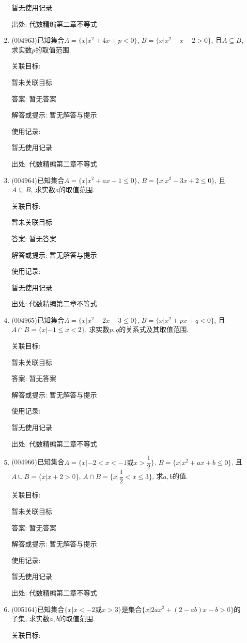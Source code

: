 \documentclass[10pt,a4paper]{article}
\begin{document}
\begin{enumerate}[1.]
暂无使用记录


出处: 代数精编第二章不等式
\item { (004963)}已知集合$A=\{x|x^2+4x+p<0\}$, $B=\{x|x^2-x-2>0\}$, 且$A\subseteq B$, 求实数$p$的取值范围.


关联目标:

暂未关联目标

答案: 暂无答案

解答或提示: 暂无解答与提示

使用记录:

暂无使用记录


出处: 代数精编第二章不等式
\item { (004964)}已知集合$A=\{x|x^2+ax+1\le 0\}$, $B=\{x|x^2-3x+2\le 0\}$, 且$A\subseteq B$, 求实数$a$的取值范围.


关联目标:

暂未关联目标

答案: 暂无答案

解答或提示: 暂无解答与提示

使用记录:

暂无使用记录


出处: 代数精编第二章不等式
\item { (004965)}已知集合$A=\{x|x^2-2x-3\le 0\}$, $B=\{x|x^2+px+q<0\}$, 且$A\cap B=\{x|-1\le x<2\}$, 求实数$p,q$的关系式及其取值范围.


关联目标:

暂未关联目标

答案: 暂无答案

解答或提示: 暂无解答与提示

使用记录:

暂无使用记录


出处: 代数精编第二章不等式
\item { (004966)}已知集合$A=\{x|-2<x<-1\text{或}x>\dfrac 12\}$, $B=\{x|x^2+ax+b\le 0\}$, 且$A\cup B=\{x|x+2>0\}$, $A\cap B=\{x|\dfrac 12<x\le 3\}$, 求$a,b$的值.


关联目标:

暂未关联目标

答案: 暂无答案

解答或提示: 暂无解答与提示

使用记录:

暂无使用记录


出处: 代数精编第二章不等式
\item { (005164)}已知集合$\{x|x<-2\text{或}x>3\}$是集合$\{x|2ax^2+(2-ab)x-b>0\}$的子集, 求实数$a,b$的取值范围.


关联目标:


\end{enumerate}
\end{document}
